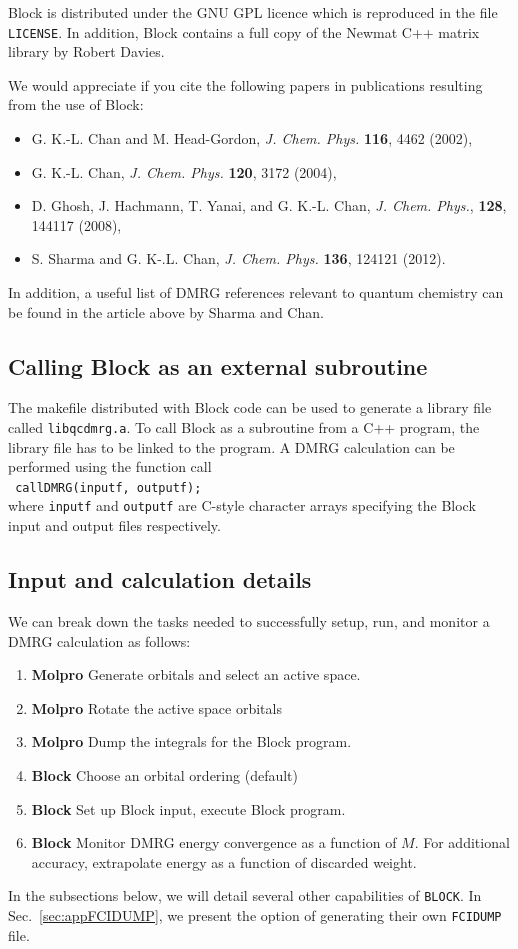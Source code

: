\documentclass[letterpaper,12pt,aps, pra]{revtex4-1}
\begin{document}
Block is distributed under the GNU GPL licence which is reproduced in the file \texttt{LICENSE}. In addition, Block contains a 
full copy of the Newmat C++ matrix library by Robert Davies.

We would appreciate if you cite the following papers in publications resulting from the use of Block:
\begin{itemize}
 \item G. K.-L. Chan and M. Head-Gordon, \emph{J. Chem. Phys.} \textbf{116}, 4462 (2002),
 \item G. K.-L. Chan, \emph{J. Chem. Phys.} \textbf{120}, 3172 (2004),
 \item D. Ghosh, J. Hachmann, T. Yanai, and G. K.-L. Chan, \emph{J. Chem. Phys.}, {\bf 128}, 144117 (2008),
 \item S. Sharma and G. K-.L. Chan, \emph{J. Chem. Phys.} \textbf{136}, 124121 (2012).
\end{itemize}

In addition, a useful list of DMRG references relevant to quantum chemistry
can be found in the article above by Sharma and Chan.

\subsection{Calling Block as an external subroutine}
\label{sec:External}
The makefile distributed with Block code can be used to generate a library file
called \texttt{libqcdmrg.a}. To call Block as a subroutine from a C++ program,
the library file has to be linked to the program. A DMRG calculation can be
performed using the function call\\
\texttt{
callDMRG(inputf, outputf);\\
} 
where \texttt{inputf} and \texttt{outputf} are C-style character arrays specifying the Block input and output files respectively.

\subsection{Input and calculation details}
\label{sec:appDetails}
We can break down the tasks needed to successfully setup, run, and monitor a DMRG calculation as follows:
\begin{enumerate}
\item {\bf Molpro} Generate orbitals and select an active space. 
\item {\bf Molpro} Rotate the active space orbitals
\item {\bf Molpro} Dump the integrals for the Block program.
\item {\bf Block} Choose an orbital ordering (default)
\item {\bf Block} Set up Block input, execute Block program.
\item {\bf Block} Monitor DMRG energy convergence as a function of $M$. For additional accuracy, extrapolate energy as a function of discarded weight. 
\end{enumerate}
In the subsections below, we will detail several other capabilities of
\texttt{BLOCK}. In Sec.~\ref{sec:appFCIDUMP}, we present the option of
generating their own \texttt{FCIDUMP} file.
\end{document}
